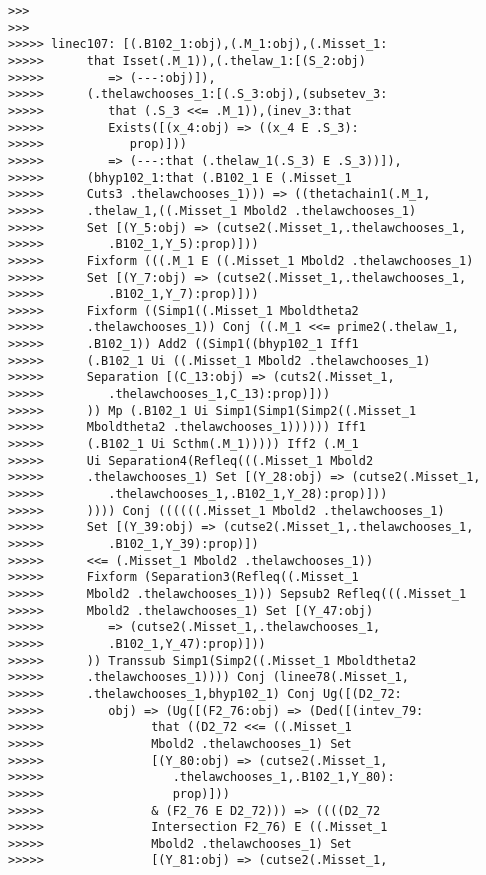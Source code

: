 \documentclass[12pt]{article}
\begin{document}
\begin{verbatim}
>>>
>>>
>>>>> linec107: [(.B102_1:obj),(.M_1:obj),(.Misset_1:
>>>>>      that Isset(.M_1)),(.thelaw_1:[(S_2:obj)
>>>>>         => (---:obj)]),
>>>>>      (.thelawchooses_1:[(.S_3:obj),(subsetev_3:
>>>>>         that (.S_3 <<= .M_1)),(inev_3:that
>>>>>         Exists([(x_4:obj) => ((x_4 E .S_3):
>>>>>            prop)]))
>>>>>         => (---:that (.thelaw_1(.S_3) E .S_3))]),
>>>>>      (bhyp102_1:that (.B102_1 E (.Misset_1
>>>>>      Cuts3 .thelawchooses_1))) => ((thetachain1(.M_1,
>>>>>      .thelaw_1,((.Misset_1 Mbold2 .thelawchooses_1)
>>>>>      Set [(Y_5:obj) => (cutse2(.Misset_1,.thelawchooses_1,
>>>>>         .B102_1,Y_5):prop)]))
>>>>>      Fixform (((.M_1 E ((.Misset_1 Mbold2 .thelawchooses_1)
>>>>>      Set [(Y_7:obj) => (cutse2(.Misset_1,.thelawchooses_1,
>>>>>         .B102_1,Y_7):prop)]))
>>>>>      Fixform ((Simp1((.Misset_1 Mboldtheta2
>>>>>      .thelawchooses_1)) Conj ((.M_1 <<= prime2(.thelaw_1,
>>>>>      .B102_1)) Add2 ((Simp1((bhyp102_1 Iff1
>>>>>      (.B102_1 Ui ((.Misset_1 Mbold2 .thelawchooses_1)
>>>>>      Separation [(C_13:obj) => (cuts2(.Misset_1,
>>>>>         .thelawchooses_1,C_13):prop)]))
>>>>>      )) Mp (.B102_1 Ui Simp1(Simp1(Simp2((.Misset_1
>>>>>      Mboldtheta2 .thelawchooses_1)))))) Iff1
>>>>>      (.B102_1 Ui Scthm(.M_1))))) Iff2 (.M_1
>>>>>      Ui Separation4(Refleq(((.Misset_1 Mbold2
>>>>>      .thelawchooses_1) Set [(Y_28:obj) => (cutse2(.Misset_1,
>>>>>         .thelawchooses_1,.B102_1,Y_28):prop)]))
>>>>>      )))) Conj ((((((.Misset_1 Mbold2 .thelawchooses_1)
>>>>>      Set [(Y_39:obj) => (cutse2(.Misset_1,.thelawchooses_1,
>>>>>         .B102_1,Y_39):prop)])
>>>>>      <<= (.Misset_1 Mbold2 .thelawchooses_1))
>>>>>      Fixform (Separation3(Refleq((.Misset_1
>>>>>      Mbold2 .thelawchooses_1))) Sepsub2 Refleq(((.Misset_1
>>>>>      Mbold2 .thelawchooses_1) Set [(Y_47:obj)
>>>>>         => (cutse2(.Misset_1,.thelawchooses_1,
>>>>>         .B102_1,Y_47):prop)]))
>>>>>      )) Transsub Simp1(Simp2((.Misset_1 Mboldtheta2
>>>>>      .thelawchooses_1)))) Conj (linee78(.Misset_1,
>>>>>      .thelawchooses_1,bhyp102_1) Conj Ug([(D2_72:
>>>>>         obj) => (Ug([(F2_76:obj) => (Ded([(intev_79:
>>>>>               that ((D2_72 <<= ((.Misset_1
>>>>>               Mbold2 .thelawchooses_1) Set
>>>>>               [(Y_80:obj) => (cutse2(.Misset_1,
>>>>>                  .thelawchooses_1,.B102_1,Y_80):
>>>>>                  prop)]))
>>>>>               & (F2_76 E D2_72))) => ((((D2_72
>>>>>               Intersection F2_76) E ((.Misset_1
>>>>>               Mbold2 .thelawchooses_1) Set
>>>>>               [(Y_81:obj) => (cutse2(.Misset_1,

\end{verbatim}
\end{document}
